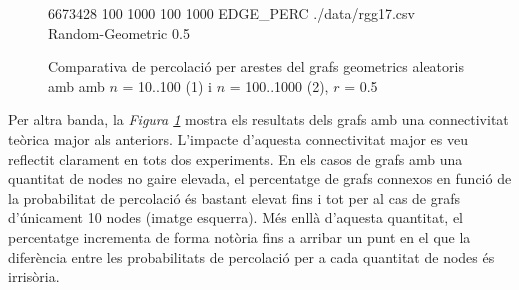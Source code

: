 \documentclass[a4paper]{article}
\begin{document}
\begin{figure}[H]
\begin{minipage}{0.45\textwidth}
			\footnotesize{6673428 100 1000 100 1000 EDGE\_PERC ./data/rgg17.csv Random-Geometric 0.5}
		\end{minipage}
		\caption{Comparativa de percolació per arestes del grafs geometrics aleatoris amb amb $n$ = 10..100 (1) i $n$ = 100..1000 (2), $r$ = 0.5}
		\label{fig:percolation_edges_rgg_0.5}
	\end{figure}
	
	Per altra banda, la \textit{Figura \ref{fig:percolation_edges_rgg_0.5}} mostra els resultats dels grafs amb una connectivitat teòrica major als anteriors. L'impacte d'aquesta connectivitat major es veu reflectit clarament en tots dos experiments. En els casos de grafs amb una quantitat de nodes no gaire elevada, el percentatge de grafs connexos en funció de la probabilitat de percolació és bastant elevat fins i tot per al cas de grafs d'únicament 10 nodes (imatge esquerra). Més enllà d'aquesta quantitat, el percentatge incrementa de forma notòria fins a arribar un punt en el que la diferència entre les probabilitats de percolació per a cada quantitat de nodes és irrisòria.
	
\end{document}

